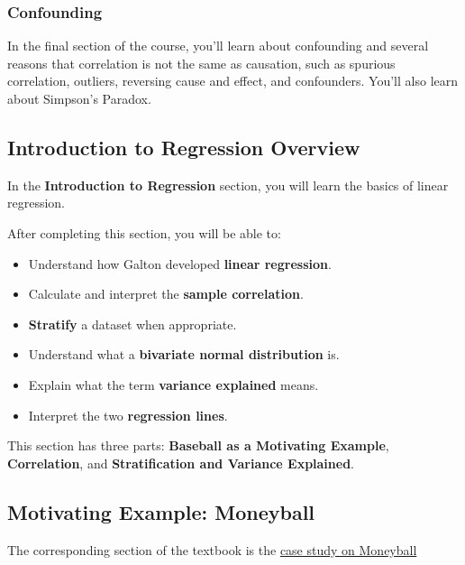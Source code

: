\documentclass[
]{article}
\providecommand{\tightlist}{%
  \setlength{\itemsep}{0pt}\setlength{\parskip}{0pt}}
\begin{document}
\hypertarget{confounding}{%
\subsubsection{Confounding}\label{confounding}}

In the final section of the course, you'll learn about confounding and
several reasons that correlation is not the same as causation, such as
spurious correlation, outliers, reversing cause and effect, and
confounders. You'll also learn about Simpson's Paradox.

\hypertarget{introduction-to-regression-overview}{%
\subsection{Introduction to Regression
Overview}\label{introduction-to-regression-overview}}

In the \textbf{Introduction to Regression} section, you will learn the
basics of linear regression.

After completing this section, you will be able to:

\begin{itemize}
\tightlist
\item
  Understand how Galton developed \textbf{linear regression}.
\item
  Calculate and interpret the \textbf{sample correlation}.
\item
  \textbf{Stratify} a dataset when appropriate.
\item
  Understand what a \textbf{bivariate normal distribution} is.
\item
  Explain what the term \textbf{variance explained} means.
\item
  Interpret the two \textbf{regression lines}.
\end{itemize}

This section has three parts: \textbf{Baseball as a Motivating Example},
\textbf{Correlation}, and \textbf{Stratification and Variance
Explained}.

\hypertarget{motivating-example-moneyball}{%
\subsection{Motivating Example:
Moneyball}\label{motivating-example-moneyball}}

The corresponding section of the textbook is the
\href{https://rafalab.github.io/dsbook/linear-models.html\#case-study-moneyball}{case
study on Moneyball}
\end{document}
